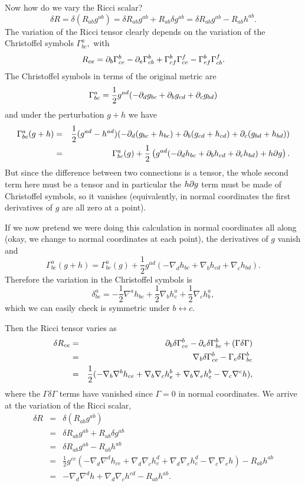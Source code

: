 Now how do we vary the Ricci scalar?
$$\delta R = \delta(R_{ab} g^{ab})=\delta R_{ab} g^{ab} +R_{ab} \delta g^{ab}= \delta R_{ab} g^{ab}-R_{ab} h^{ab}.$$
The variation of the Ricci tensor clearly depends on the variation of the Christoffel symbols $\Gamma^a_{bc},$ with
$$R_{ce}=\partial_b \Gamma^b_{ce}-\partial_e \Gamma^b_{cb}+\Gamma^b_{cf} \Gamma^f_{ce}-\Gamma^b_{ef}\Gamma^f_{cb}.$$
The Christoffel symbols in terms of the original metric are
$$\Gamma^a_{bc}=\frac{1}{2}g^{ad}(-\partial_d g_{bc}+\partial_b g_{cd} +\partial_c g_{bd})$$
and under the perturbation $g+h$ we have
\begin{eqnarray*}
\Gamma^a_{bc}(g+h)&=&\frac{1}{2}(g^{ad}-h^{ad})(-\partial_d (g_{bc}+h_{bc})+\partial_b (g_{cd}+h_{cd})+\partial_c(g_{bd}+h_{bd}))\\
&=&\Gamma^a_{bc}(g)+\frac{1}{2}\left(g^{ad}(-\partial_d h_{bc}+\partial_b h_{cd}+\partial_c h_{bd})+h\partial g\right).
\end{eqnarray*}
But since the difference between two connections is a tensor, the whole second term here must be a tensor and in particular the $h\partial g$ term must be made of Christoffel symbols, so it vanishes (equivalently, in normal coordinates the first derivatives of $g$ are all zero at a point).%

If we now pretend we were doing this calculation in normal coordinates all along (okay, we change to normal coordinates at each point), the derivatives of $g$ vanish and
$$\Gamma^a_{bc}(g+h)=\Gamma^a_{bc}(g)+\frac{1}{2}g^{ad}\left(-\nabla_d h_{bc}+\nabla_b h_{cd}+\nabla_c h_{bd}\right).$$
Therefore the variation in the Christoffel symbols is
$$\delta^a_{bc}=-\frac{1}{2} \nabla^a h_{bc} +\frac{1}{2} \nabla_b h^a_c +\frac{1}{2}\nabla_c h^a_b,$$
which we can easily check is symmetric under $b\leftrightarrow c$.

Then the Ricci tensor varies as
\begin{eqnarray*}
\delta R_{ce}&=& \partial_b \delta \Gamma^b_{ce} -\partial_e \delta \Gamma^b_{bc} +(\Gamma \delta \Gamma)\\
&=& \nabla_b \delta \Gamma^b_{ce} -\Gamma_e \delta \Gamma^b_{bc}\\
&=&\frac{1}{2} (-\nabla_b \nabla^b h_{ce} +\nabla_b \nabla_c h^b_e + \nabla_b \nabla_e h^b_c - \nabla_c \nabla^c h),
\end{eqnarray*}
where the $\Gamma \delta \Gamma$ terms have vanished since $\Gamma=0$ in normal coordinates.
We arrive at the variation of the Ricci scalar,
\begin{eqnarray*}
\delta R &=& \delta (R_{ab} g^{ab})\\
&=&\delta R_{ab} g^{ab} + R_{ab} \delta g^{ab}\\
&=& \delta R_{ab} g^{ab} -R_{ab} h^{ab}\\
&=& \frac{1}{2}g^{ce} (-\nabla_d \nabla^d h_{ce} +\nabla_d \nabla_c h^d_e + \nabla_d \nabla_e h^d_c -\nabla_c \nabla_e h)-R_{ab} h^{ab}\\
&=& -\nabla_d \nabla^d h + \nabla_d \nabla_c h^{cd}-R_{ab} h^{ab}.
\end{eqnarray*}

